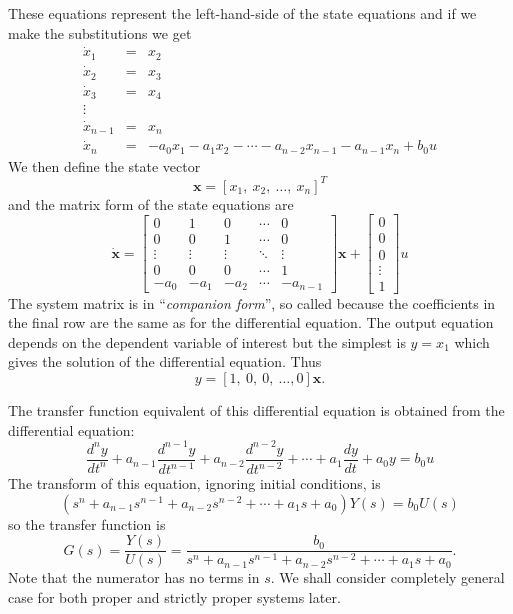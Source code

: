 These equations represent the left-hand-side of the state
equations and if we make the substitutions we get
\begin{eqnarray*}
\dot{x}_1 &=&
   x_2 \\ \dot{x}_2 &=&  x_3   \\
\dot{x}_3 & = &  x_4
\\ \vdots \\ \dot{x}_{n-1}  &=& x_n \\ \dot{x}_{n} &=&
-a_{0}x_1 -a_1x_2 - \cdots  -a_{n-2}x_{n-1} -a_{n-1}x_{n} + b_0 u
\end{eqnarray*}
We then define the state vector \[\mathbf{x}=[x_1,\ x_2,\ \ldots,\
x_n]^T\] and the matrix form of the state equations are
\[
\dot{\mathbf{x}} = \left[\begin{array}{ccccc}
  0 & 1 & 0 & \cdots & 0 \\
  0 & 0 & 1 & \cdots & 0 \\
  \vdots & \vdots & \vdots & \ddots & \vdots \\
  0 & 0 & 0 & \cdots & 1 \\
  -a_{0} & -a_{1} & -a_{2} & \cdots & -a_{n-1}
\end{array}\right]\mathbf{x}+\left[\begin{array}{c}
  0 \\
  0 \\
  0 \\
  \vdots \\
  1
\end{array}\right]u
\]
The system matrix is in ``\emph{companion form}'', so called because the
coefficients in the final row are the same as for the differential
equation. The output equation depends on the dependent variable of
interest but the simplest is $y=x_1$ which gives the solution of
the differential equation. Thus
\[y = [1,\ 0,\ 0,\ \ldots, 0] \mathbf{x}.\]

The transfer function equivalent of this differential equation is
obtained from the differential equation:
\[
\frac{d^{n}y}{dt^{n}} +
a_{n-1}\frac{d^{n-1}y}{dt^{n-1}}+a_{n-2}\frac{d^{n-2}y}{dt^{n-2}}+\cdots+a_1\frac{dy}{dt}+a_0
y = b_0 u
\]
The transform of this equation, ignoring initial conditions, is
\[
\left(s^n +
a_{n-1}s^{n-1}+a_{n-2}s^{n-2}+\cdots+a_1s+a_0\right)Y(s) = b_0
U(s)
\]
so the transfer function is
\[
G(s) = \frac{Y(s)}{U(s)} = \frac{b_0}{s^n +
a_{n-1}s^{n-1}+a_{n-2}s^{n-2}+\cdots+a_1s+a_0}.
\]
Note that the numerator has no terms in $s$. We shall consider
completely general case for both proper and strictly proper
systems later.


